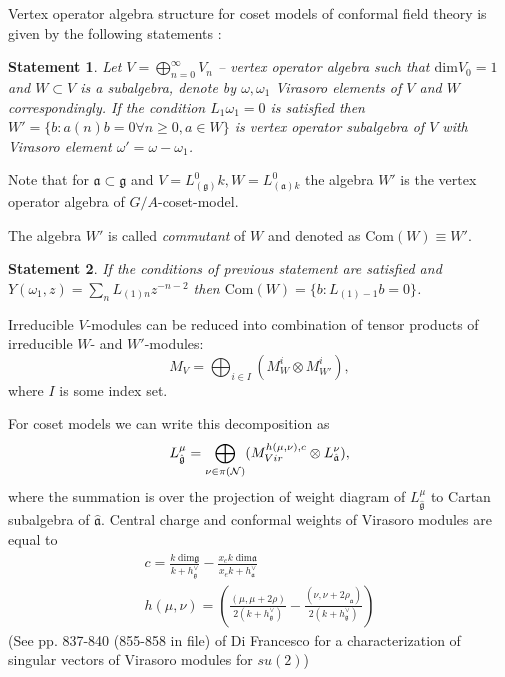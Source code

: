 \documentclass[12pt]{article}
\newtheorem{statement}{Statement}
\newcommand{\gf}{\mathfrak{g}}
\newcommand{\af}{\mathfrak{a}}
\newcommand{\gfh}{\hat{\mathfrak{g}}}
\newcommand{\afh}{\hat{\mathfrak{a}}}
\begin{document}
Vertex operator algebra structure for coset models of conformal field theory is given by the following statements \cite{frenkel1992vertex}:
\begin{statement}
\label{thm:cosets}
Let  $V=\bigoplus_{n=0}^{\infty} V_n$ -- vertex operator algebra such that $\mathrm{dim}V_0=1$ and $W\subset V$ is a subalgebra, denote by $\omega,\omega_1$ Virasoro elements of  $V$ and $W$ correspondingly. If the condition  $L_1\omega_1 =0$ is satisfied then $W'=\{b:
  a(n)b=0 \forall n\geq 0, a\in W\}$ is vertex operator subalgebra of  $V$ with Virasoro element $\omega'=\omega-\omega_1$.
\end{statement}
Note that for $\af\subset\gf$ and $V=L^0_{(\gf)}k, W=L^0_{(\af)k}$ the algebra
$W'$ is the vertex operator algebra of  $G/A$-coset-model. 

The algebra  $W'$ is called {\it commutant} of $W$ and denoted as $\mathrm{Com}(W)\equiv W'$.
\begin{statement}
  If the conditions of previous statement are satisfied and  $Y(\omega_1,z)=\sum_n
  L_{(1)n} z^{-n-2}$ then $\mathrm{Com}(W)=\{b: L_{(1)-1}b=0\}$. 
\end{statement}

Irreducible $V$-modules can be reduced into combination of tensor products of irreducible $W$- and $W'$-modules:
\begin{equation}
  \label{eq:1}
  M_V=\bigoplus_{i\in I} (M^i_{W}\otimes M^i_{W'}),
\end{equation}
where $I$ is some index set. 

For coset models we can write this decomposition as
\begin{equation}
  \label{eq:3}
  L^{\mu}_{\gfh}=\bigoplus_{\nu \in \pi({\cal N})} (M^{h(\mu,\nu),c}_{Vir} \otimes L^{\nu}_{\afh}),
\end{equation}
where the summation is over the projection of weight diagram of $L^{\mu}_{\gfh}$ to Cartan subalgebra of $\afh$. Central charge and conformal weights of Virasoro modules are equal to
\begin{eqnarray}
  \label{eq:4}
    c=\frac{k\;\mathrm{dim}\gf}{k+h^{\vee}_{\gf}}-\frac{x_e k\;\mathrm{dim}\af}{x_e k+h^{\vee}_{\af}}\\
    h(\mu,\nu)=\left(\frac{(\mu,\mu+2\rho)}{2(k+h^{\vee}_{\gf})}-\frac{(\nu,\nu+2\rho_{\af})}{2(k+h^{\vee}_{\gf})}\right)
\end{eqnarray}
(See pp. 837-840 (855-858 in file) of Di Francesco for a characterization of singular vectors of Virasoro modules for $su(2)$) 
\end{document}
